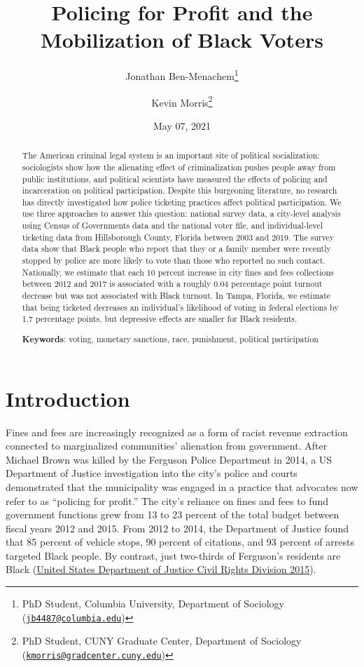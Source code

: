 \documentclass[
  12pt,
]{article}
\title{Policing for Profit and the Mobilization of Black Voters}
\author{Jonathan Ben-Menachem\footnote{PhD Student, Columbia University, Department of Sociology (\href{mailto:jb4487@columbia.edu}{\nolinkurl{jb4487@columbia.edu}})} \and Kevin Morris\footnote{PhD Student, CUNY Graduate Center, Department of Sociology (\href{mailto:kmorris@gradcenter.cuny.edu}{\nolinkurl{kmorris@gradcenter.cuny.edu}})}}
\date{May 07, 2021}
\begin{document}
\maketitle
\begin{abstract}
The American criminal legal system is an important site of political socialization: sociologists show how the alienating effect of criminalization pushes people away from public institutions, and political scientists have measured the effects of policing and incarceration on political participation. Despite this burgeoning literature, no research has directly investigated how police ticketing practices affect political participation. We use three approaches to answer this question: national survey data, a city-level analysis using Census of Governments data and the national voter file, and individual-level ticketing data from Hillsborough County, Florida between 2003 and 2019. The survey data show that Black people who report that they or a family member were recently stopped by police are more likely to vote than those who reported no such contact. Nationally, we estimate that each 10 percent increase in city fines and fees collections between 2012 and 2017 is associated with a roughly 0.04 percentage point turnout decrease but was not associated with Black turnout. In Tampa, Florida, we estimate that being ticketed decreases an individual's likelihood of voting in federal elections by 1.7 percentage points, but depressive effects are smaller for Black residents.

\hfill\break

\textbf{Keywords}: voting, monetary sanctions, race, punishment, political participation
\end{abstract}

\pagebreak

\doublespacing

\hypertarget{introduction}{%
\section*{Introduction}\label{introduction}}

Fines and fees are increasingly recognized as a form of racist revenue extraction connected to marginalized communities' alienation from government. After Michael Brown was killed by the Ferguson Police Department in 2014, a US Department of Justice investigation into the city's police and courts demonstrated that the municipality was engaged in a practice that advocates now refer to as ``policing for profit.'' The city's reliance on fines and fees to fund government functions grew from 13 to 23 percent of the total budget between fiscal years 2012 and 2015. From 2012 to 2014, the Department of Justice found that 85 percent of vehicle stops, 90 percent of citations, and 93 percent of arrests targeted Black people. By contrast, just two-thirds of Ferguson's residents are Black (\protect\hyperlink{ref-UnitedStatesDepartmentofJusticeCivilRightsDivision2015}{United States Department of Justice Civil Rights Division 2015}).
\end{document}

